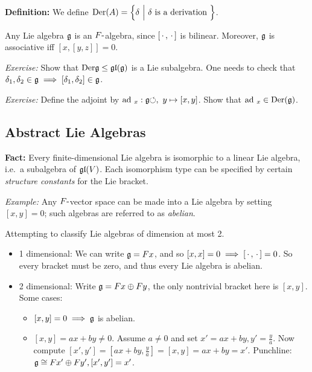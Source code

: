 \textbf{Definition:} We define
\(\mathrm{Der}(A) = \left\{{\delta {~\mathrel{\Big|}~} \delta\text{ is a derivation }}\right\}\).

Any Lie algebra \({\mathfrak{g}}\) is an \(F{\hbox{-}}\)algebra, since
\([{\,\cdot\,}, {\,\cdot\,}]\) is bilinear. Moreover, \({\mathfrak{g}}\) is associative iff
\([x, [y,z]] = 0\).

\emph{Exercise:} Show that \(\mathrm{Der} {\mathfrak{g}} \leq {\mathfrak{gl}}({\mathfrak{g}})\) is
a Lie subalgebra. One needs to check that
\(\delta_1, \delta_2 \in {\mathfrak{g}} \implies [\delta_1, \delta_2] \in {\mathfrak{g}}\).

\emph{Exercise:} Define the adjoint by
\(\mathrm{ad}~_x: {\mathfrak{g}}{\circlearrowleft},~ y \mapsto [x, y]\). Show that
\(\mathrm{ad}~_x \in \mathrm{Der}({\mathfrak{g}})\).

\hypertarget{abstract-lie-algebras}{%
\subsection{Abstract Lie Algebras}\label{abstract-lie-algebras}}

\textbf{Fact:} Every finite-dimensional Lie algebra is isomorphic to a
linear Lie algebra, i.e.~a subalgebra of \({\mathfrak{gl}}(V)\). Each isomorphism
type can be specified by certain \emph{structure constants} for the Lie
bracket.

\emph{Example:} Any \(F{\hbox{-}}\)vector space can be made into a Lie
algebra by setting \([x,y] = 0\); such algebras are referred to as
\emph{abelian}.

Attempting to classify Lie algebras of dimension at most 2.

\begin{itemize}
\tightlist
\item
  1 dimensional: We can write \({\mathfrak{g}} = Fx\), and so
  \([x, x] = 0 \implies [{\,\cdot\,}, {\,\cdot\,}] = 0\). So every bracket must be
  zero, and thus every Lie algebra is abelian.
\item
  2 dimensional: Write \({\mathfrak{g}} = Fx \oplus Fy\), the only nontrivial
  bracket here is \([x, y]\). Some cases:

  \begin{itemize}
  \tightlist
  \item
    \([x, y] = 0 \implies {\mathfrak{g}}\) is abelian.
  \item
    \([x, y] = ax + by \neq 0\). Assume \(a\neq 0\) and set
    \(x' = ax+by, y' = \frac y a\). Now compute
    \([x', y'] = [ax+by, \frac y a] = [x,y] = ax+by = x'\). Punchline:
    \({\mathfrak{g}} \cong Fx' \oplus Fy', [x', y'] = x'\).
  \end{itemize}
\end{itemize}

